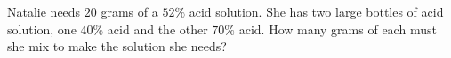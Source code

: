 Natalie needs $20$ grams of a $52\%$ acid solution. She has two large bottles of acid solution, one $40\%$ acid and the other $70\%$ acid. How many grams of each must she mix to make the solution she needs?
